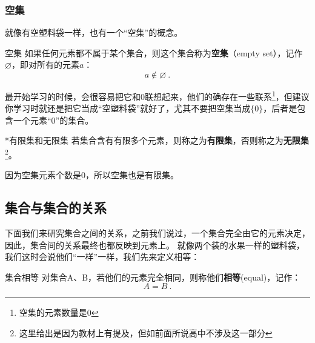 
\subsubsection{空集}

就像有空塑料袋一样，也有一个“空集”的概念。

\begin{definition}{空集}
如果任何元素都不属于某个集合，则这个集合称为\textbf{空集}（empty set），记作 $\varnothing$，即对所有的元素$a$：
\begin{equation}
a\notin\varnothing~.
\end{equation}
\end{definition}

最开始学习的时候，会很容易把它和$0$联想起来，他们的确存在一些联系\footnote{空集的元素数量是0}，但建议你学习时就还是把它当成“空塑料袋”就好了，尤其不要把空集当成$\{0\}$，后者是包含一个元素“$0$”的集合。

\begin{definition}{*有限集和无限集}
若集合含有有限多个元素，则称之为\textbf{有限集}，否则称之为\textbf{无限集}\footnote{这里给出是因为教材上有提及，但如前面所说高中不涉及这一部分}。
\end{definition}

因为空集元素个数是0，所以空集也是有限集。


\subsection{集合与集合的关系}\label{sub_HsSet_1}
下面我们来研究集合之间的关系，之前我们说过，一个集合完全由它的元素决定，因此，集合间的关系最终也都反映到元素上。
就像两个装的水果一样的塑料袋，我们这时会说他们“一样”一样，我们先来定义相等：
\begin{definition}{集合相等}
对集合A、B，若他们的元素完全相同，则称他们\textbf{相等}(equal)，记作：
\begin{equation}
A=B~.
\end{equation}
\end{definition}

